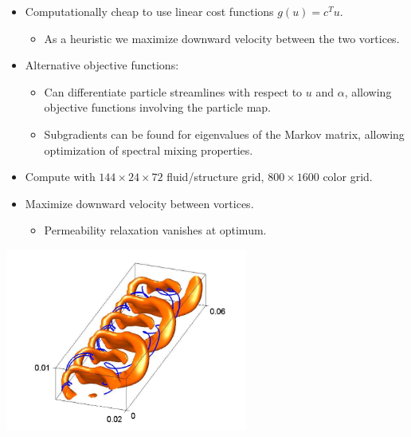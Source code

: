 \documentclass[12pt,t]{beamer}
\begin{document}
\begin{frame}
  \begin{itemize}
  \item Computationally cheap to use linear cost functions $g(u) = c^Tu$.
    \begin{itemize}
    \item As a heuristic we maximize downward velocity between the two
      vortices.
    \end{itemize}
  \item Alternative objective functions:
    \begin{itemize}
    \item Can differentiate particle streamlines with respect to $u$ and
      $\alpha$, allowing objective functions involving the particle map.
    \item Subgradients can be found for eigenvalues of the Markov
      matrix, allowing optimization of spectral mixing properties.
    \end{itemize}
  \item Compute with $144 \times 24 \times 72$ fluid/structure grid,
    $800 \times 1600$ color grid.
  \end{itemize}
\end{frame}
\begin{frame}
  \begin{itemize}
  \item Maximize downward velocity between vortices.
    \begin{itemize}
    \item Permeability relaxation vanishes at optimum.
    \end{itemize}
  \end{itemize}
  \begin{center}
    \includegraphics[height=6cm]{my3dstructure}
  \end{center}
\end{frame}
\end{document}
